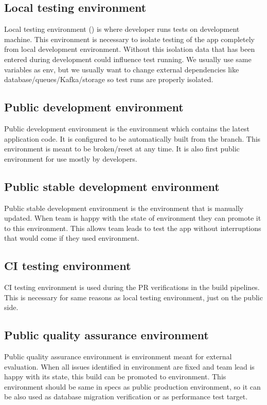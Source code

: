     \subsection{Local testing environment}\label{subsec:local-testing-environment}
    Local testing environment () is where developer runs tests on development machine.
    This environment is necessary to isolate testing of the app completely from local development environment.
    Without this isolation data that has been entered during development could influence test running.
    We usually use same variables as  env, but we usually want to change external dependencies
    like database/queues/Kafka/storage so test runs are properly isolated.

    \subsection{Public development environment}\label{subsec:public-development-environment}
    Public development environment is the environment which contains the latest application code.
    It is configured to be automatically built from the  branch.
    This environment is meant to be broken/reset at any time.
    It is also first public environment for use mostly by developers.

    \subsection{Public stable development environment}\label{subsec:public-stable-development-environment}
    Public stable development environment  is the environment that is manually updated.
    When team is happy with the state of  environment they can promote it to this environment.
    This allows team leads to test the app without interruptions that would come if they used  environment.

    \subsection{CI testing environment}\label{subsec:ci-testing-environment}
    CI testing environment is used during the PR verifications in the build pipelines.
    This is necessary for same reasons as local testing environment, just on the public side.

    \subsection{Public quality assurance environment}\label{subsec:public-quality-assurance-environment}
    Public quality assurance environment  is environment meant for external evaluation.
    When all issues identified in  environment are fixed and team lead is happy with its state,
    this build can be promoted to  environment.
    This environment should be same in specs as public production environment, so it can be also used as database
    migration verification or as performance test target.

